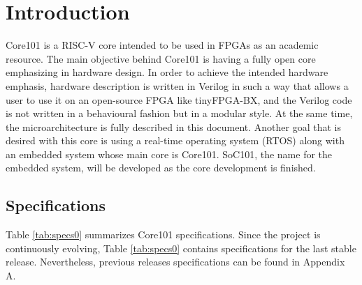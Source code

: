 \documentclass{article}
\begin{document}
\begin{titlepage}
\end{titlepage}

\tableofcontents

\listoffigures

\listoftables

\newpage
\section{Introduction}
Core101 is a RISC-V core intended to be used in FPGAs as an academic resource. The main objective behind Core101 is having a fully open core emphasizing in hardware design. In order to achieve the intended hardware emphasis, hardware description is written in Verilog in such a way that allows a user to use it on an open-source FPGA like tinyFPGA-BX, and the Verilog code is not written in a behavioural fashion but in a modular style. At the same time, the microarchitecture is fully described in this document. Another goal that is desired with this core is using a real-time operating system (RTOS) along with an embedded system whose main core is Core101. SoC101, the name for the embedded system, will be developed as the core development is finished.

\subsection{Specifications}
Table \ref{tab:specs0} summarizes Core101 specifications. Since the project is continuously evolving, Table \ref{tab:specs0} contains specifications for the last stable release. Nevertheless, previous releases specifications can be found in Appendix A.
\end{document}
